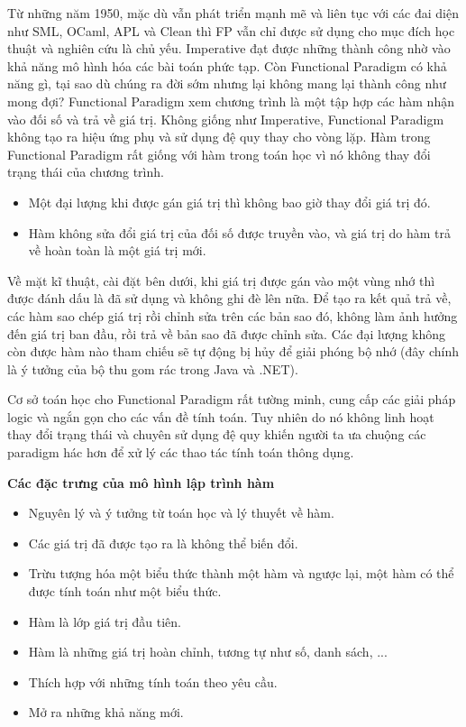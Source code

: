 \documentclass[10pt, a4paper]{article}
\begin{document}
Từ những năm 1950, mặc dù vẫn phát triển mạnh mẽ và liên tục với các đai diện như SML, OCaml, APL và Clean thì FP vẫn chỉ được sử dụng cho mục đích học thuật và nghiên cứu là chủ yếu. Imperative đạt được những thành công nhờ vào khả năng mô hình hóa các bài toán phức tạp. Còn Functional Paradigm có khả năng gì, tại sao dù chúng ra đời sớm nhưng lại không mang lại thành công như mong đợi?
Functional Paradigm xem chương trình là một tập hợp các hàm nhận vào đối số và trả về giá trị. Không giống như Imperative, Functional Paradigm không tạo ra hiệu ứng phụ và sử dụng đệ quy thay cho vòng lặp. Hàm trong Functional Paradigm rất giống với hàm trong toán học vì nó không thay đổi trạng thái của chương trình.

\begin{itemize}
\item Một đại lượng khi được gán giá trị thì không bao giờ thay đổi giá trị đó.
\item Hàm không sửa đổi giá trị của đối số được truyền vào, và giá trị do hàm trả về hoàn toàn là một giá trị mới.
\end{itemize}

Về mặt kĩ thuật, cài đặt bên dưới, khi giá trị được gán vào một vùng nhớ thì được đánh dấu là đã sử dụng và không ghi đè lên nữa. Để tạo ra kết quả trả về, các hàm sao chép giá trị rồi chỉnh sửa trên các bản sao đó, không làm ảnh hưởng đến giá trị ban đầu, rồi trả về bản sao đã được chỉnh sửa. Các đại lượng không còn được hàm nào tham chiếu sẽ tự động bị hủy để giải phóng bộ nhớ (đây chính là ý tưởng của bộ thu gom rác trong Java và .NET).

Cơ sở toán học cho Functional Paradigm rất tường minh, cung cấp các giải pháp logic và ngắn gọn cho các vấn đề tính toán. Tuy nhiên do nó không linh hoạt thay đổi trạng thái và chuyên sử dụng đệ quy khiến người ta ưa chuộng các paradigm hác hơn để xử lý các thao tác tính toán thông dụng.

\textbf{Các đặc trưng của mô hình lập trình hàm}
\begin{itemize}
\item Nguyên lý và ý tưởng từ toán học và lý thuyết về hàm.
\item Các giá trị đã được tạo ra là không thể biến đổi.
\item Trừu tượng hóa một biểu thức thành một hàm và ngược lại, một hàm có thể được tính toán như một biểu thức.
\item Hàm là lớp giá trị đầu tiên.
\item Hàm là những giá trị hoàn chỉnh, tương tự như số, danh sách, ...
\item Thích hợp với những tính toán theo yêu cầu.
\item Mở ra những khả năng mới.
\end{itemize}
\end{document}
